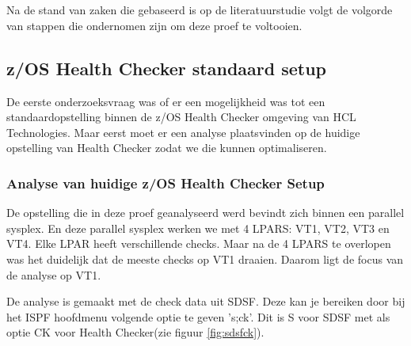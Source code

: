 
\chapter{}
\label{ch:methodologie}




Na de stand van zaken die gebaseerd is op de literatuurstudie volgt de volgorde van stappen die ondernomen zijn om deze proef te voltooien. 

\section{z/OS Health Checker standaard setup}
\label{sec:z/OS Health Checker Standaard setup}

De eerste onderzoeksvraag was of er een mogelijkheid was tot een standaardopstelling binnen de z/OS Health Checker omgeving van HCL Technologies. Maar eerst moet er een analyse plaatsvinden op de huidige opstelling van Health Checker zodat we die kunnen optimaliseren.

\subsection{Analyse van huidige z/OS Health Checker Setup}
\label{subsec:Analyse van huidige z/OS Health Checker Setup}
De opstelling die in deze proef geanalyseerd werd bevindt zich binnen een parallel sysplex. En deze parallel sysplex werken we met 4 LPARS: VT1, VT2, VT3 en VT4. Elke LPAR heeft verschillende checks. Maar na de 4 LPARS te overlopen was het duidelijk dat de meeste checks op VT1 draaien. Daarom ligt de focus van de analyse op VT1.

De analyse is gemaakt met de check data uit SDSF. Deze kan je bereiken door bij het ISPF hoofdmenu volgende optie te geven 's;ck'. Dit is S voor SDSF met als optie CK voor Health Checker(zie figuur \ref{fig:sdsfck}).

